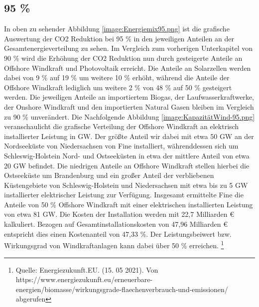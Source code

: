 \subsection{95 \%}


In oben zu sehender Abbildung \ref{image:Energiemix95.png} ist die grafische Auswertung der CO2 Reduktion bei 95 \% in den jeweiligen Anteilen an der Gesamtenergieverteilung zu sehen. Im Vergleich zum vorherigen Unterkapitel von 90 \% wird die Erhöhung der CO2 Reduktion nun durch gesteigerte Anteile an Offshore Windkraft und Photovoltaik erreicht. Die Anteile an Solarzellen werden dabei von 9 \% auf 19 \% um weitere 10 \% erhöht, während die Anteile der Offshore Windkraft lediglich um weitere 2 \% von 48 \% auf 50 \% gesteigert werden. Die jeweiligen Anteile an importiertem Biogas, der Laufwasserkraftwerke, der Onshore Windkraft und den importierten Natural Gasen bleiben im Vergleich zu 90 \% unverändert. 
Die Nachfolgende Abbildung \ref{image:KapazitätWind-95.png} veranschaulicht die grafische Verteilung der Offshore Windkraft an elektrisch installierter Leistung in GW. 
Der größte Anteil wir dabei mit etwa 50 GW an der Nordseeküste von Niedersachsen von Fine installiert, währenddessen sich um Schleswig-Holstein Nord- und Ostseeküsten in etwa der mittlere Anteil von etwa 20 GW befindet. 
Die niedrigen Anteile an Offshore Windkraft stellen hierbei die Ostseeküste um Brandenburg und ein großer Anteil der verbliebenen Küstengebiete von Schleswig-Holstein und Niedersachsen mit etwa bis zu 5 GW installierter elektrischer Leistung zur Verfügung. 
Insgesamt ermittelte Fine die Anteile von 50 \% Offshore Windkraft mit einer elektrischen installierten Leistung von etwa 81 GW. Die Kosten der Installation werden mit 22,7 Milliarden € kalkuliert. Bezogen auf Gesamtinstallationskosten von 47,96 Milliarden € entspricht dies einen Kostenanteil von 47,33  \%. 
Der Leistungsbeiwert bzw. Wirkungsgrad von Windkraftanlagen kann dabei über 50 \% erreichen. \footnote{Quelle: Energiezukunft.EU. (15. 05 2021). Von https://www.energiezukunft.eu/erneuerbare-energien/biomasse/wirkungsgrade-flaechenverbrauch-und-emissionen/ abgerufen} 


